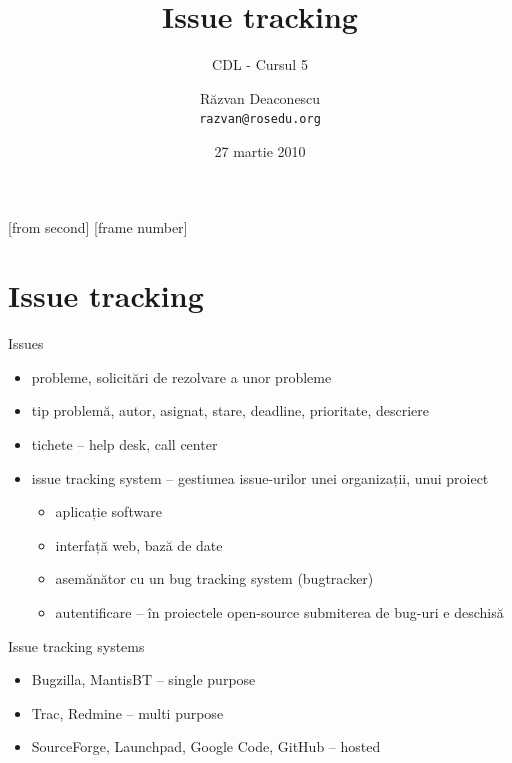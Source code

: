 \documentclass{beamer}
\title[Issue tracking]{Issue tracking}
\subtitle{CDL - Cursul 5}
\institute[ROSEdu]{ROSEdu}
\date{27 martie 2010}
\author{Răzvan Deaconescu \\ \texttt{razvan@rosedu.org}}
\begin{document}
[from second]
[frame number]

\frame{\titlepage}

\frame{\tableofcontents}


\section{Issue tracking}

\frame{\tableofcontents[currentsection]}


\begin{frame}{Issues}
  \begin{itemize}
    \pause \item probleme, solicitări de rezolvare a unor probleme
    \pause \item tip problemă, autor, asignat, stare, deadline, prioritate,
descriere
    \pause \item tichete -- help desk, call center
    \pause \item issue tracking system -- gestiunea issue-urilor unei
organizații, unui proiect
      \begin{itemize}
        \pause \item aplicație software
        \pause \item interfață web, bază de date
        \pause \item asemănător cu un bug tracking system (bugtracker)
        \pause \item autentificare -- în proiectele open-source submiterea de
bug-uri e deschisă
      \end{itemize}
  \end{itemize}
\end{frame}

\begin{frame}{Issue tracking systems}
  \begin{itemize}
    \pause \item Bugzilla, MantisBT -- single purpose
    \pause \item Trac, Redmine -- multi purpose
    \pause \item SourceForge, Launchpad, Google Code, GitHub -- hosted
  \end{itemize}
\end{frame}
\end{document}
